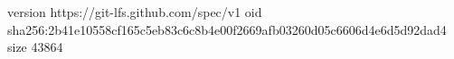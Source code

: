 version https://git-lfs.github.com/spec/v1
oid sha256:2b41e10558cf165c5eb83c6c8b4e00f2669afb03260d05c6606d4e6d5d92dad4
size 43864
